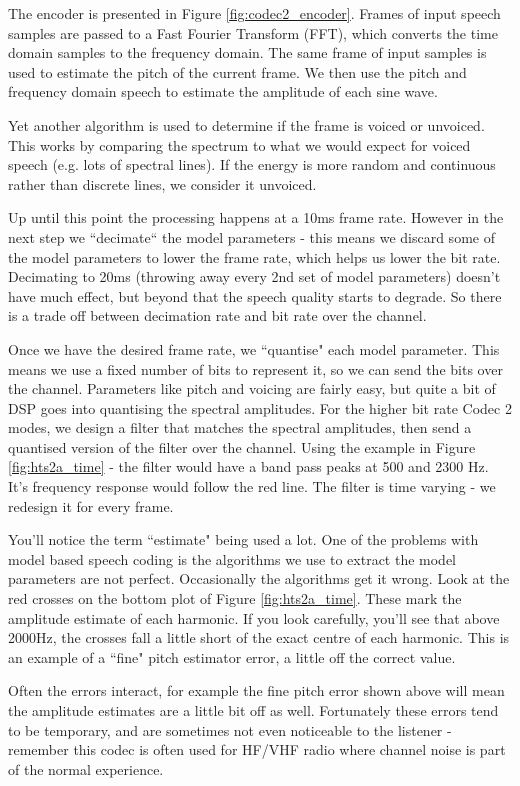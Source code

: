 \documentclass{article}
\begin{document}
The encoder is presented in Figure \ref{fig:codec2_encoder}.  Frames of input speech samples are passed to a Fast Fourier Transform (FFT), which converts the time domain samples to the frequency domain.  The same frame of input samples is used to estimate the pitch of the current frame. We then use the pitch and frequency domain speech to estimate the amplitude of each sine wave.

Yet another algorithm is used to determine if the frame is voiced or unvoiced.  This works by comparing the spectrum to what we would expect for voiced speech (e.g. lots of spectral lines).  If the energy is more random and continuous rather than discrete lines, we consider it unvoiced.

Up until this point the processing happens at a 10ms frame rate.  However in the next step we ``decimate`` the model parameters - this means we discard some of the model parameters to lower the frame rate, which helps us lower the bit rate.  Decimating to 20ms (throwing away every 2nd set of model parameters) doesn't have much effect, but beyond that the speech quality starts to degrade.  So there is a trade off between decimation rate and bit rate over the channel.

Once we have the desired frame rate, we ``quantise" each model parameter.  This means we use a fixed number of bits to represent it, so we can send the bits over the channel.  Parameters like pitch and voicing are fairly easy, but quite a bit of DSP goes into quantising the spectral amplitudes. For the higher bit rate Codec 2 modes, we design a filter that matches the spectral amplitudes, then send a quantised version of the filter over the channel. Using the example in Figure \ref{fig:hts2a_time} - the filter would have a band pass peaks at 500 and 2300 Hz.  It's frequency response would follow the red line. The filter is time varying - we redesign it for every frame.

You'll notice the term ``estimate" being used a lot.  One of the problems with model based speech coding is the algorithms we use to extract the model parameters are not perfect.  Occasionally the algorithms get it wrong.  Look at the red crosses on the bottom plot of Figure \ref{fig:hts2a_time}.  These mark the amplitude estimate of each harmonic.  If you look carefully, you'll see that above 2000Hz, the crosses fall a little short of the exact centre of each harmonic.  This is an example of a ``fine" pitch estimator error, a little off the correct value.

Often the errors interact, for example the fine pitch error shown above will mean the amplitude estimates are a little bit off as well. Fortunately these errors tend to be temporary, and are sometimes not even noticeable to the listener - remember this codec is often used for HF/VHF radio where channel noise is part of the normal experience.
 
\end{document}

